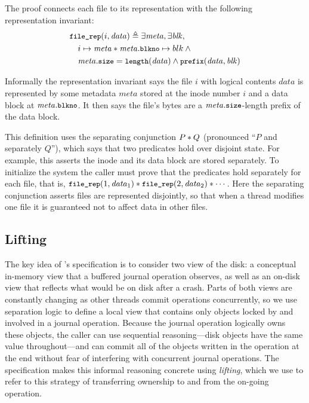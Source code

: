 The \simplenfs proof connects each file to its representation with the following
representation invariant:
%
\begin{align*}
  &\cc{file_rep}(i, \mathit{data}) \defeq \exists \mathit{meta}, \exists \mathit{blk}, \\
  &\quad i \mapsto \mathit{meta} \sep \mathit{meta}.\cc{blkno} \mapsto blk \land \phantom{} \\
  &\quad \mathit{meta}.\cc{size} = \cc{length}(\mathit{data}) \land \cc{prefix}(\mathit{data}, \mathit{blk})
\end{align*}

Informally the representation invariant says the file $i$ with logical contents $\mathit{data}$ is represented by some
metadata $\mathit{meta}$ stored at the inode number $i$ and a data block at
$\mathit{meta}.\cc{blkno}$. It then says the file's bytes are a
$\mathit{meta}.\cc{size}$-length prefix of the data block.

This definition uses the separating conjunction $P * Q$ (pronounced ``$P$ and
separately $Q$''), which says that two predicates hold over disjoint state.
For example, this asserts the inode and its data block are stored
separately. To initialize the system the caller must prove that the
 predicates hold separately for each file, that is,
$\cc{file_rep}(1, \mathit{data}_1) \sep \cc{file_rep}(2, \mathit{data}_2) \sep \cdots$. Here the
separating conjunction asserts files are represented disjointly, so that when a
thread modifies one file it is guaranteed not to affect data in other files.

\subsection{Lifting}
\label{s:design:lifting}

\newcommand{\bufobjDurable}{\cc{durable_pred}\xspace}

The key idea of \txn's specification is to consider two view of the disk: a
conceptual in-memory view that a buffered journal operation observes, as well as
an on-disk view that reflects what would be on disk after a crash. Parts of both views are constantly changing as
other threads commit operations concurrently, so we use separation logic to
define a local view that contains only objects locked by and involved in a
journal operation. Because the journal operation logically owns these objects, the caller
can use sequential reasoning---disk objects have the same value throughout---and can commit all of the objects written in the operation at
the end without fear of interfering with concurrent journal operations. The
specification makes this informal reasoning concrete using \emph{lifting}, which
we use to refer to this strategy of transferring ownership to and from the
on-going operation.

